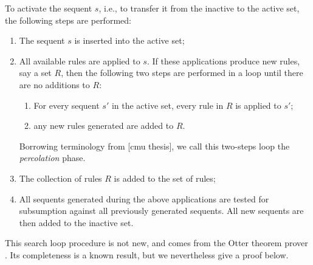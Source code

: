 \begin{definition}[Activation]
  To activate the sequent $s$, i.e., to transfer it from the inactive to the
  active set, the following steps are performed:

  \begin{enumerate}
  \item The sequent $s$ is inserted into the active set;
  \item All available rules are applied to $s$. If these applications produce
    new rules, say a set $R$, then the following two steps are performed in a
    loop until there are no additions to $R$:

    \begin{enumerate}
    \item For every sequent $s'$ in the active set, every rule in $R$ is applied
      to $s'$;
    \item any new rules generated are added to $R$.
    \end{enumerate}

    Borrowing terminology from [cmu thesis], we call this two-steps loop the
    \emph{percolation} phase.
  \item The collection of rules $R$ is added to the set of rules;
  \item All sequents generated during the above applications are tested for
    subsumption against all previously generated sequents. All new
    sequents are then added to the inactive set.
  \end{enumerate}
\end{definition}

This search loop procedure is not new, and comes from the Otter theorem prover
\cite{otter}. Its completeness is a known result, but we nevertheless give a
proof below.

